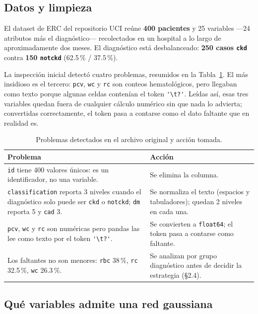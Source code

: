 \documentclass[11pt, a4paper]{article}
\begin{document}
\subsection{Datos y limpieza}

El dataset de ERC del repositorio UCI \cite{ckd2015} reúne \textbf{400 pacientes} y 25 variables
—24 atributos más el diagnóstico— recolectados en un hospital a lo largo de aproximadamente dos
meses. El diagnóstico está desbalanceado: \textbf{250 casos \texttt{ckd}} contra
\textbf{150 \texttt{notckd}} (62.5\,\% / 37.5\,\%).

La inspección inicial detectó cuatro problemas, resumidos en la Tabla~\ref{tab:limpieza}. El más
insidioso es el tercero: \texttt{pcv}, \texttt{wc} y \texttt{rc} son conteos hematológicos, pero
llegaban como texto porque algunas celdas contenían el token \verb|'\t?'|. Leídas así, esas tres
variables quedan fuera de cualquier cálculo numérico sin que nada lo advierta; convertidas
correctamente, el token pasa a contarse como el dato faltante que en realidad es.

\begin{table}[H]
\centering
\caption{Problemas detectados en el archivo original y acción tomada.}
\label{tab:limpieza}
\small
\renewcommand{\arraystretch}{1.15}
\begin{tabular}{p{7.2cm} p{7.2cm}}
\toprule
\textbf{Problema} & \textbf{Acción} \\
\midrule
\texttt{id} tiene 400 valores únicos: es un identificador, no una variable. & Se elimina la columna. \\
\texttt{classification} reporta 3 niveles cuando el diagnóstico solo puede ser \texttt{ckd} o \texttt{notckd}; \texttt{dm} reporta 5 y \texttt{cad} 3. & Se normaliza el texto (espacios y tabuladores); quedan 2 niveles en cada una. \\
\texttt{pcv}, \texttt{wc} y \texttt{rc} son numéricas pero pandas las lee como texto por el token \verb|'\t?'|. & Se convierten a \texttt{float64}; el token pasa a contarse como faltante. \\
Los faltantes no son menores: \texttt{rbc} 38\,\%, \texttt{rc} 32.5\,\%, \texttt{wc} 26.3\,\%. & Se analizan por grupo diagnóstico antes de decidir la estrategia (\S2.4). \\
\bottomrule
\end{tabular}
\end{table}

\subsection{Qué variables admite una red gaussiana}
\end{document}
